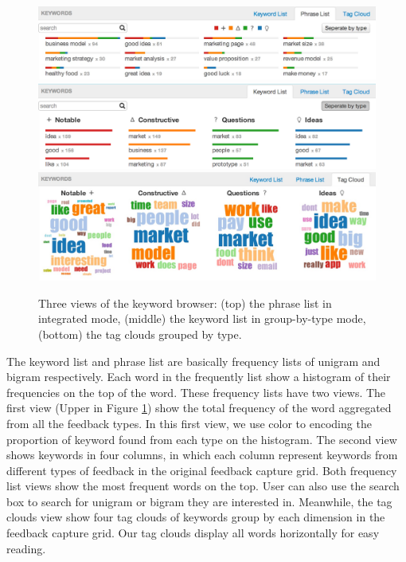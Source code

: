 \documentclass{sigchi}
\begin{document}
\begin{figure}[b]
\centering
\includegraphics[width=2.0\columnwidth]{images/phrase-list}
\includegraphics[width=2.0\columnwidth]{images/keyword-list}
\includegraphics[width=2.0\columnwidth]{images/clouds}
\caption{Three views of the keyword browser:
(top) the phrase list in integrated mode,
(middle) the keyword list in group-by-type mode,
(bottom) the tag clouds grouped by type.}
\label{fig:keyword-lists}
\end{figure}

The keyword list and phrase list are basically frequency lists of unigram and
bigram respectively.  Each word in the frequently list show a histogram of their
frequencies on the top of the word.  These frequency lists have two views.  The
first view (Upper in Figure \ref{fig:keyword-lists}) show the total frequency of the
word aggregated from all the feedback types.  In this first view, we use color
to encoding the proportion of keyword found from each type on the histogram.
The second view shows keywords in four columns, in which each column represent
keywords from different types of feedback in the original feedback capture grid.
Both frequency list views show the most frequent words on the top.  User can
also use the search box to search for unigram or bigram they are interested in.
Meanwhile, the tag clouds view show four tag clouds of keywords group by each
dimension in the feedback capture grid.  Our tag clouds display all words
horizontally for easy reading.
\end{document}
